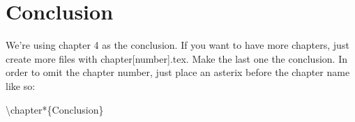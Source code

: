\chapter*{Conclusion}
\pagestyle{fancy}

We're using chapter 4 as the conclusion. If you want to have more chapters, just create more files with chapter[number].tex. Make the last one the conclusion. In order to omit the chapter number, just place an asterix before the chapter name like so:

\textbackslash chapter*\{Conclusion\}
